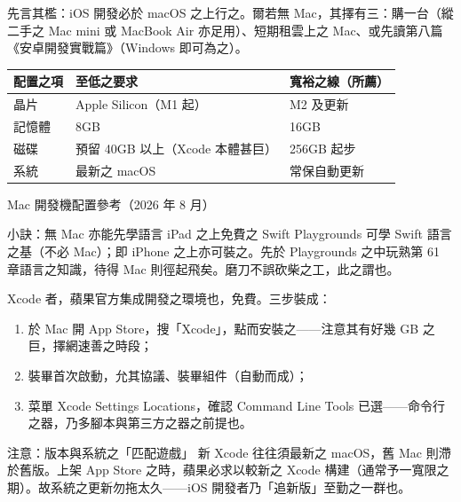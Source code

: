


先言其檻：iOS 開發必於 macOS 之上行之。爾若無 Mac，其擇有三：購一台（縱二手之 Mac mini 或 MacBook Air 亦足用）、短期租雲上之 Mac、或先讀第八篇《安卓開發實戰篇》（Windows 即可為之）。

\begin{center}
\begin{tabularx}{\linewidth}{|X|X|X|}
\hline
\textbf{配置之項} & \textbf{至低之要求} & \textbf{寬裕之線（所薦）} \tabularnewline
\hline
晶片 & Apple Silicon（M1 起） & M2 及更新 \tabularnewline
記憶體 & 8GB & 16GB \tabularnewline
磁碟 & 預留 40GB 以上（Xcode 本體甚巨） & 256GB 起步 \tabularnewline
系統 & 最新之 macOS & 常保自動更新 \tabularnewline
\hline
\end{tabularx}
\end{center}

\begin{center}\small\color{gray}Mac 開發機配置參考（2026 年 8 月）\end{center}

\begin{tcbinfo}{小訣：無 Mac 亦能先學語言}
iPad 之上免費之 Swift Playgrounds 可學 Swift 語言之基（不必 Mac）；即 iPhone 之上亦可裝之。先於 Playgrounds 之中玩熟第 61 章語言之知識，待得 Mac 則徑起飛矣。磨刀不誤砍柴之工，此之謂也。

\end{tcbinfo}


Xcode 者，蘋果官方集成開發之環境也，免費。三步裝成：

\begin{enumerate}
  \item 於 Mac 開 App Store，搜「Xcode」，點而安裝之——注意其有好幾 GB 之巨，擇網速善之時段；
  \item 裝畢首次啟動，允其協議、裝畢組件（自動而成）；
  \item 菜單 Xcode Settings Locations，確認 Command Line Tools 已選——命令行之器，乃多腳本與第三方之器之前提也。
\end{enumerate}

\begin{tcbwarn}{注意：版本與系統之「匹配遊戲」}
新 Xcode 往往須最新之 macOS，舊 Mac 則滯於舊版。上架 App Store 之時，蘋果必求以較新之 Xcode 構建（通常予一寬限之期）。故系統之更新勿拖太久——iOS 開發者乃「追新版」至勤之一群也。

\end{tcbwarn}

